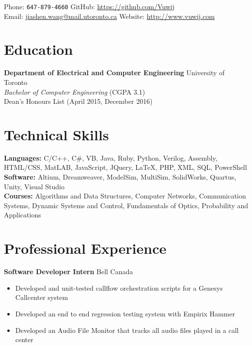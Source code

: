 \documentclass[10pt, a4paper]{cv}
\begin{document}

Phone: \texttt{647-879-4660} \hfill
GitHub: \href{https://github.com/Vuwij}{https://github.com/Vuwij}\\
Email: \href{mailto:jiashen.wang@mail.utoronto.ca}{jiashen.wang@mail.utoronto.ca}\hfill
Website: \href{http://www.vuwij.com}{http://www.vuwij.com}\\

\section*{Education}
\textbf{Department of Electrical and Computer Engineering} \hfill University of Toronto\\
\emph{Bachelor of Computer Engineering} \small{\textsc{(CGPA 3.1)}}\\[0.1mm]
\small Dean's Honours List (April 2015, December 2016)

\section*{Technical Skills}
\textbf{Languages:} C/C++, C\#, VB, Java, Ruby, Python, Verilog, Assembly, HTML/CSS, MatLAB, JavaScript, JQuery, LaTeX, PHP, XML, SQL, PowerShell\\[0.2em]
\textbf{Software:} Altium, Dreamweaver, ModelSim, MultiSim, SolidWorks, Quartus, Unity, Visual Studio\\[0.2em]
\textbf{Courses:} Algorithms and Data Structures, Computer Networks, Communication Systems, Dynamic Systems and Control, Fundamentals of Optics, Probability and Applications

\section*{Professional Experience}\noindent

	\textbf{Software Developer Intern} \hfill Bell Canada
	\begin{itemize}
		\item Developed and unit-tested callflow orchestration scripts for a Genesys Callcenter system
		\item Developed an end to end regression testing system with Empirix Hammer
		\item Developed an Audio File Monitor that tracks all audio files played in a call center
	\end{itemize}
	
\end{document}

